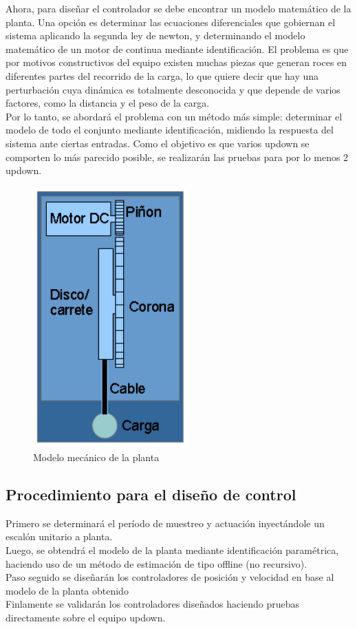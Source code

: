 Ahora, para diseñar el controlador se debe encontrar un modelo matemático de la planta. Una opción es determinar las ecuaciones diferenciales que gobiernan el sistema aplicando la segunda ley de newton, y determinando el modelo matemático de un motor de continua mediante identificación. El problema es que por motivos constructivos del equipo existen muchas piezas que generan roces en diferentes partes del recorrido de la carga, lo que quiere decir que hay una perturbación cuya dinámica es totalmente desconocida y que depende de varios factores, como la distancia y el peso de la carga.\\
Por lo tanto, se abordará el problema con un método más simple: determinar el modelo de todo el conjunto mediante identificación, midiendo la respuesta del sistema ante ciertas entradas. Como el objetivo es que varios updown se comporten lo más parecido posible, se realizarán las pruebas para por lo menos 2 updown. 

\begin{figure}[!ht]
	\centering
	\includegraphics[width=6cm,scale=1]{resources/2_2-modeloMecPlanta.png}
	\caption{Modelo mecánico de la planta}
	\label{fig:\thefigure}
\end{figure}


\subsection{Procedimiento para el diseño de control}
Primero se determinará el período de muestreo y actuación inyectándole un escalón unitario a planta.\\
Luego, se obtendrá el modelo de la planta mediante identificación paramétrica, haciendo uso de un método de estimación de tipo offline (no recursivo).\\
Paso seguido se diseñarán los controladores de posición y velocidad en base al modelo de la planta obtenido\\
Finlamente se validarán los controladores diseñados haciendo pruebas directamente sobre el equipo updown.

